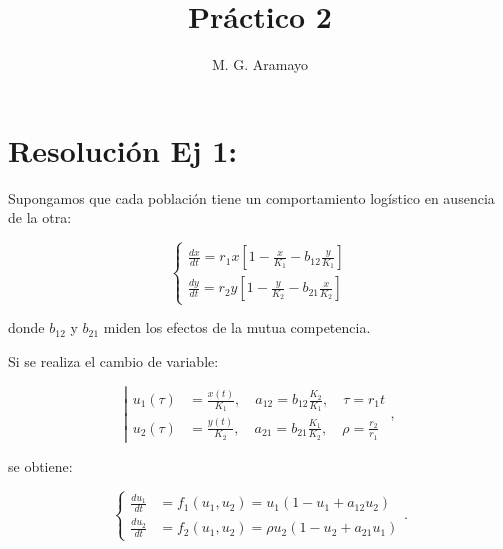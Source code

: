 \documentclass[twocolumn,aps,prl]{revtex4-1}
\begin{document}

\title{Práctico 2}
\author{M. G. Aramayo}


\maketitle



\section{Resolución Ej 1:}

Supongamos que cada población tiene un comportamiento logístico en ausencia de la otra:

$$
\left\{
\begin{aligned}
    \frac{d x}{d t}=r_{1} x\left[1-\frac{x}{K_{1}}-b_{12} \frac{y}{K_{1}}\right] \\
    \frac{d y}{d t}=r_{2} y\left[1-\frac{y}{K_{2}}-b_{21} \frac{x}{K_{2}}\right]
\end{aligned}
\right.
$$

donde $b_{12}$ y $b_{21}$ miden los efectos de la mutua competencia. 

Si se realiza el cambio de variable:

\begin{equation} \label{eq:cambio de variable}
\left\lvert 
    \begin{aligned}
    u_1(\tau) &= \frac{x(t)}{K_{1}}, \quad a_{12} = b_{12} \frac{K_{2}}{K_{1}}, \quad \tau=r_{1} t \\
    u_2(\tau) &= \frac{y(t)}{K_{2}}, \quad a_{21} = b_{21} \frac{K_{1}}{K_{2}}, \quad \rho=\frac{r_{2}}{r_{1}}
    \end{aligned}
\right. ,
\end{equation}

se obtiene:

\begin{equation} \label{eq:adimenzionalizada}
\left\{
\begin{aligned}
    \frac{d u_{1}}{d t} &= f_{1}\left(u_{1}, u_{2}\right) = u_{1}\left(1-u_{1}+a_{12} u_{2}\right) \\
    \frac{d u_{2}}{d t} &= f_{2}\left(u_{1}, u_{2}\right) = \rho u_{2}\left(1-u_{2}+a_{21} u_{1}\right)
\end{aligned}
\right.  .  
\end{equation}
\end{document}
